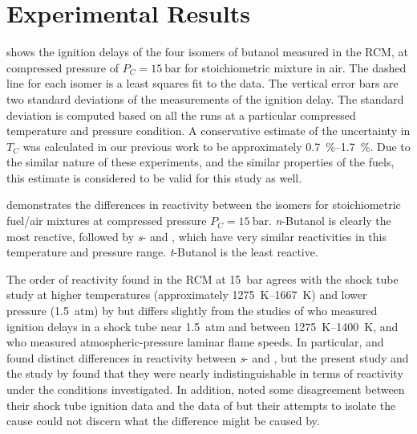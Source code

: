 \documentclass[../main.tex]{subfiles}
\begin{document}
\section{Experimental Results}
\label{sec:buoh-expts}

 shows the ignition delays of the four isomers of
butanol measured in the RCM, at compressed pressure of $P_C=\SI{15}{\bar}$ for
stoichiometric mixture in air. The dashed line for each isomer is a least
squares fit to the data. The vertical error bars are two standard deviations
of the measurements of the ignition delay. The standard deviation is computed
based on all the runs at a particular compressed temperature and pressure
condition. A conservative estimate of the uncertainty in $T_C$ was calculated
in our previous work to be approximately \SIrange{0.7}{1.7}{\percent}. Due to the similar nature
of these experiments, and the similar properties of the fuels, this estimate
is considered to be valid for this study as well.

 demonstrates the differences in reactivity between
the isomers for stoichiometric fuel/air mixtures at compressed pressure
$P_C=\SI{15}{\bar}$. \textit{n}-Butanol is clearly the most reactive, followed by
\textit{s}- and \iBuOH{}, which have very similar reactivities in
this temperature and pressure range. \textit{t}-Butanol is the least reactive.

The order of reactivity found in the RCM at \SI{15}{\bar} agrees with the shock tube
study at higher temperatures (approximately \SIrange{1275}{1667}{\kelvin}) and lower pressure
(\SI{1.5}{atm}) by \textcite{Stranic2012} but differs slightly from the studies of
\textcite{Moss2008} who measured ignition delays in a shock tube near \SI{1.5}{atm}
and between \SIrange{1275}{1400}{\kelvin}, and \textcite{Veloo2011a} who measured
atmospheric-pressure laminar flame speeds. In particular, \textcite{Moss2008}
and \textcite{Veloo2011a} found distinct differences in reactivity between
\textit{s}- and \iBuOH{}, but the present study and the study by
\textcite{Stranic2012} found that they were nearly indistinguishable in terms
of reactivity under the conditions investigated. In addition,
\textcite{Stranic2012} noted some disagreement between their shock tube
ignition data and the data of \textcite{Moss2008} but their attempts to isolate
the cause could not discern what the difference might be caused by.
\end{document}
